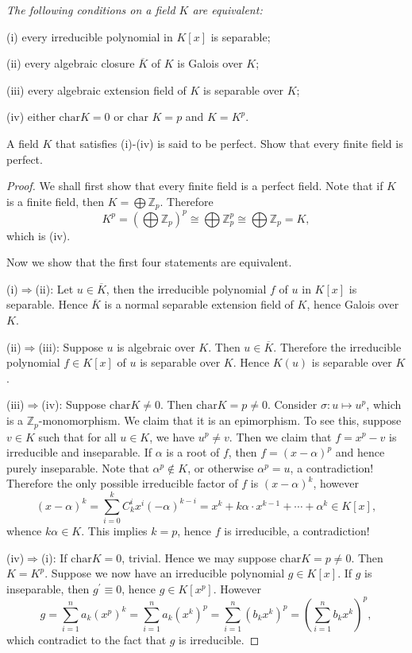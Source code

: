 \begin{problem}\em
The following conditions on a field $K$ are equivalent:\par
(i) every irreducible polynomial in $K[x]$ is separable;\par
(ii) every algebraic closure $\overline{K}$ of $K$ is Galois over $K$;\par
(iii) every algebraic extension field of $K$ is separable over $K$;\par
(iv) either $\mathrm{char}K=0$ or $\text{char }K=p$ and $K=K^p$.\par
A field $K$ that satisfies (i)-(iv) is said to be perfect. Show that every finite field is perfect.
\end{problem}
\begin{proof}
We shall first show that every finite field is a perfect field. Note that if $K$ is a finite field, then $K=\bigoplus\mathbb{Z}_p$. Therefore 
$$
K^p=\left( \bigoplus{\mathbb{Z} _p} \right) ^p\cong \bigoplus{\mathbb{Z} _{p}^{p}}\cong \bigoplus{\mathbb{Z} _p}=K,
$$
which is (iv).\par
Now we show that the first four statements are equivalent.\par
(i)$\Rightarrow$(ii): Let $u\in\overline{K}$, then the irreducible polynomial $f$ of $u$ in $K[x]$ is separable. Hence $\overline{K}$ is a normal separable extension field of $K$, hence Galois over $K$.\par
(ii)$\Rightarrow$(iii): Suppose $u$ is algebraic over $K$. Then $u\in\overline{K}$. Therefore the irreducible polynomial $f\in K[x]$ of $u$ is separable over $K$. Hence $K(u)$ is separable over $K$.\par
(iii)$\Rightarrow$(iv): Suppose $\mathrm{char}K\ne 0$. Then $\mathrm{char}K=p\ne 0$. Consider $\sigma:u\mapsto u^p$, which is a $\mathbb{Z}_p$-monomorphism. We claim that it is an epimorphism. To see this, suppose $v\in K$ such that for all $u\in K$, we have $u^p\ne v$. Then we claim that $f=x^p-v$ is irreducible and inseparable. If $\alpha$ is a root of $f$, then $f=(x-\alpha)^p$ and hence purely inseparable. Note that $\alpha^p\notin K$, or otherwise $\alpha^p=u$, a contradiction! Therefore the only possible irreducible factor of $f$ is $(x-\alpha)^k$, however 
$$
\left( x-\alpha \right) ^k=\sum_{i=0}^k{C_{k}^{i}x^i\left( -\alpha \right) ^{k-i}}=x^k+k\alpha \cdot x^{k-1}+\cdots +\alpha ^k\in K\left[ x \right] ,
$$
whence $k\alpha\in K$. This implies $k=p$, hence $f$ is irreducible, a contradiction!\par
(iv)$\Rightarrow$(i): If $\mathrm{char}K=0$, trivial. Hence we may suppose $\mathrm{char}K=p\ne 0$. Then $K=K^p$. Suppose we now have an irreducible polynomial $g\in K[x]$. If $g$ is inseparable, then $g^\prime\equiv 0$, hence $g\in K[x^p]$. However 
$$
g=\sum_{i=1}^n{a_k\left( x^p \right) ^k}=\sum_{i=1}^n{a_k\left( x^k \right) ^p}=\sum_{i=1}^n{\left( b_kx^k \right) ^p}=\left( \sum_{i=1}^n{b_kx^k} \right) ^p,
$$
which contradict to the fact that $g$ is irreducible.
\end{proof}
